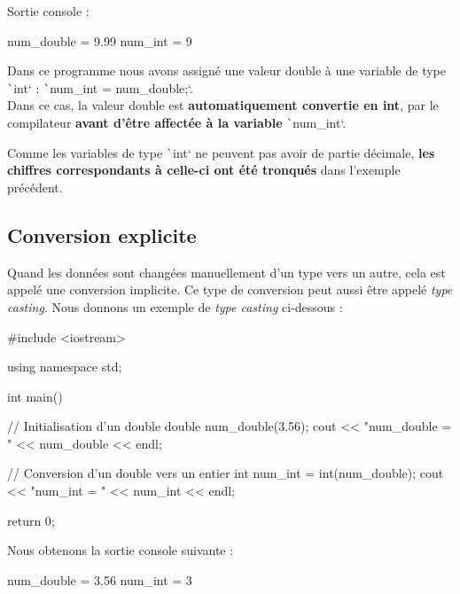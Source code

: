 \documentclass[10pt]{article}
\begin{document}
\bigskip
Sortie console :

\begin{textcode}
    num_double = 9.99
    num_int = 9
\end{textcode}

Dans ce programme nous avons assigné une valeur double à une variable de type \texttt`int` :
\texttt`num_int = num_double;`.\\
Dans ce cas, la valeur double est \textbf{automatiquement convertie en int}, par le compilateur 
\textbf{avant d'être affectée à la variable} \texttt`num_int`. 

\begin{noteblock}
    Comme les variables de type \texttt`int` ne peuvent pas avoir de partie décimale, \textbf{les chiffres
    correspondants à celle-ci ont été tronqués} dans l'exemple précédent.
\end{noteblock}



\subsection{Conversion explicite}
Quand les données sont changées manuellement d'un type vers un autre, cela est appelé une conversion implicite. Ce type de conversion peut aussi être appelé \textit{type casting}. Nous donnons un exemple de \textit{type casting} ci-dessous :

\begin{cppcode}
    #include <iostream>

    using namespace std;

    int main() {
        // Initialisation d'un double
        double num_double(3.56);
        cout << "num_double = " << num_double << endl;

        // Conversion d'un double vers un entier
        int num_int = int(num_double);
        cout << "num_int   = " << num_int << endl;

        return 0;
    }
\end{cppcode}

\bigskip
Nous obtenons la sortie console suivante :

\begin{textcode}
    num_double = 3.56
    num_int   = 3
\end{textcode}



\end{document}
